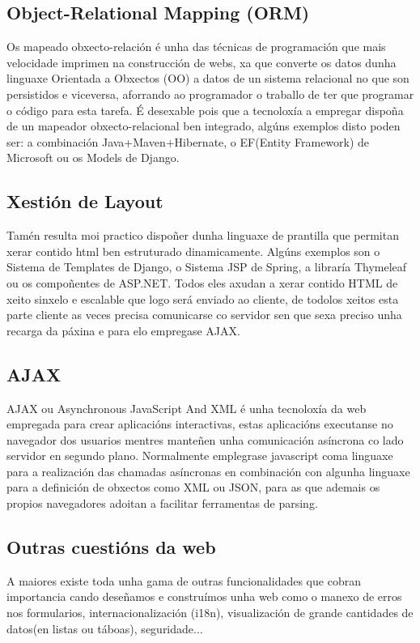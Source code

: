 	\subsection{Object-Relational Mapping (ORM)}
		Os mapeado obxecto-relación é unha das técnicas de programación que mais velocidade imprimen
		na construcción de webs, xa que converte os datos dunha linguaxe Orientada a Obxectos (OO) a 
		datos de un sistema relacional no que son persistidos e viceversa, aforrando ao programador
		o traballo de ter que programar o código para esta tarefa. É desexable pois que a tecnoloxía
		a empregar dispoña de un mapeador obxecto-relacional ben integrado, algúns exemplos disto poden
		ser: a combinación Java+Maven+Hibernate, o EF(Entity Framework) de Microsoft ou os Models de Django.
	
	\subsection{Xestión de Layout}
		Tamén resulta moi practico dispoñer dunha linguaxe de prantilla que permitan xerar contido
		html ben estruturado dinamicamente. Algúns exemplos son o Sistema de Templates de Django, o 
		Sistema JSP de Spring, a libraría Thymeleaf ou os compoñentes de ASP.NET. Todos eles axudan 
		a xerar contido HTML de xeito sinxelo e escalable que logo será enviado ao cliente, de
		todolos xeitos esta parte cliente as veces precisa comunicarse co servidor sen que sexa 
		preciso unha recarga da páxina e para elo empregase AJAX.
		
    \subsection{AJAX}
		AJAX ou Asynchronous JavaScript And XML é unha tecnoloxía da web empregada para crear 
		aplicacións interactivas, estas aplicacións executanse no navegador dos usuarios mentres 
		manteñen unha comunicación asíncrona co lado servidor en segundo plano. Normalmente 
		emplegrase javascript coma linguaxe para a realización das chamadas asíncronas en combinación
		con algunha linguaxe para a definición de obxectos como XML ou JSON, para as que ademais os
		propios navegadores adoitan a facilitar ferramentas de parsing.
		
	\subsection{Outras cuestións da web}
		A maiores existe toda unha gama de outras funcionalidades que cobran importancia cando deseñamos
		e construímos unha web como o manexo de erros nos formularios, internacionalización (i18n), 
		visualización de grande cantidades de datos(en listas ou táboas), seguridade...
		
